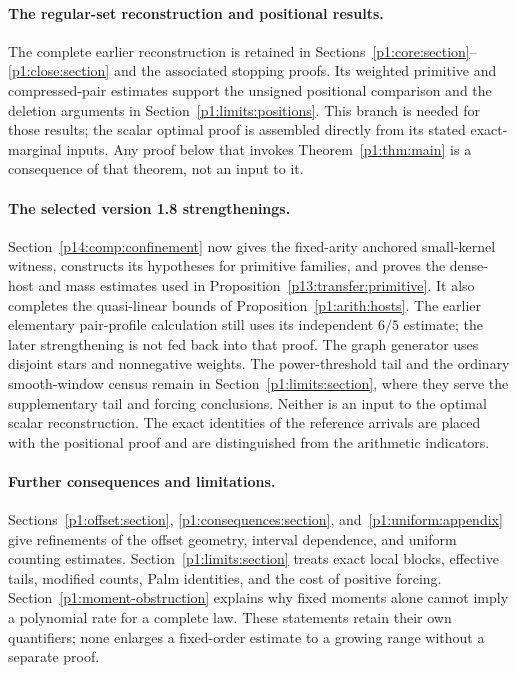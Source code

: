 \paragraph{The regular-set reconstruction and positional results.}
The complete earlier reconstruction is retained in
Sections~\ref{p1:core:section}--\ref{p1:close:section} and
the associated stopping proofs. Its weighted primitive and
compressed-pair estimates support the unsigned positional
comparison and the deletion arguments in
Section~\ref{p1:limits:positions}. This branch is needed for
those results; the scalar optimal proof is assembled directly
from its stated exact-marginal inputs. Any proof below that
invokes Theorem~\ref{p1:thm:main} is a consequence of that
theorem, not an input to it.

\paragraph{The selected version 1.8 strengthenings.}
Section~\ref{p14:comp:confinement} now gives the fixed-arity anchored
small-kernel witness, constructs its hypotheses for primitive families,
and proves the dense-host and mass estimates used in
Proposition~\ref{p13:transfer:primitive}. It also completes the
quasi-linear bounds of Proposition~\ref{p1:arith:hosts}. The earlier
elementary pair-profile calculation still uses its independent
$6/5$ estimate; the later strengthening is not fed back into that proof.
The graph generator uses disjoint stars and nonnegative weights.
The power-threshold tail and the ordinary smooth-window census remain
in Section~\ref{p1:limits:section}, where they serve the supplementary
tail and forcing conclusions. Neither is an input to the optimal
scalar reconstruction. The exact identities of the reference arrivals
are placed with the positional proof and are distinguished from the
arithmetic indicators.

\paragraph{Further consequences and limitations.}
Sections~\ref{p1:offset:section}, \ref{p1:consequences:section},
and~\ref{p1:uniform:appendix} give refinements of the offset
geometry, interval dependence, and uniform counting estimates.
Section~\ref{p1:limits:section} treats exact local blocks,
effective tails, modified counts, Palm identities, and the cost
of positive forcing. Section~\ref{p1:moment-obstruction}
explains why fixed moments alone cannot imply a polynomial
rate for a complete law. These statements retain their own
quantifiers; none enlarges a fixed-order estimate to a growing
range without a separate proof.

